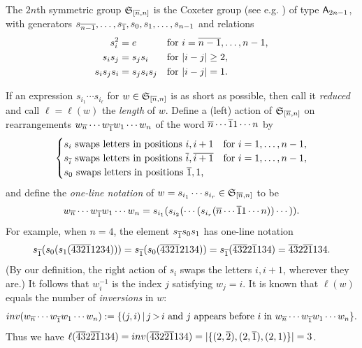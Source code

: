 \documentclass[11pt]{article}
\theoremstyle{definition}
\numberwithin{equation}{section}
\begin{document}
\label{ss:bnassubgp}
The $2n$th symmetric group
$\mathfrak{S}_{\smash{[\overline{n}, n]}}$
is the Coxeter group
(see e.g. \cite{BBCoxeter}) of type $\mathsf{A}_{2n-1}$,
with generators
  $s_{\overline{n-1}}, \dotsc, s_{\overline{1}}, s_0, s_1, \dotsc, s_{n-1}$
and relations
\begin{equation*}
  \begin{alignedat}2
    s_i^2 &= e &\quad &\text{for $i = \ol{n-1}, \dotsc, n-1$,}\\
    s_is_j &= s_js_i &\quad &\text{for $|i-j| \geq 2$,}\\
    s_is_js_i &= s_js_is_j &\quad &\text{for $|i-j| = 1$.}
  \end{alignedat}
\end{equation*}

If an expression $s_{i_1} \cdots s_{i_\ell}$ for $w \in \mathfrak{S}_{\smash{[\overline{n}, n]}}$
is as short as possible,
then call it {\em reduced} and call $\ell = \ell(w)$ the {\em length} of $w$.
Define a (left) action of $\mathfrak{S}_{\smash{[\overline{n}, n]}}$ on rearrangements
$w_{\overline{n}} \cdots w_{\overline{1}} w_1 \cdots w_n$ of the word
$\overline{n} \cdots \overline{1} 1 \cdots n$ by
\begin{equation}\label{eq:laction}
  \begin{cases}
    s_i \text{ swaps letters in positions $i, i+1$}
      &\text{for $i = 1, \dotsc, n-1$},\\
    s_{\ol i} \text{ swaps letters in positions $\ol i, \ol{i+1}$}
      &\text{for $i = 1, \dotsc, n-1$},\\
    s_0 \text{ swaps letters in positions $\ol 1, 1$,}
  \end{cases}
\end{equation}
and
define the {\em one-line notation} of $w = s_{i_1} \cdots s_{i_r} \in \mathfrak{S}_{\smash{[\overline{n}, n]}}$ to be
\begin{equation}\label{eq:s2nrearrange}
  w_{\ol n} \cdots w_{\ol 1} w_1 \cdots w_n 
= s_{i_1}(s_{i_2}( \cdots (s_{i_r}( \ol n \cdots \ol 1 1 \cdots n)) \cdots )).
\end{equation}
For example, when $n=4$, the element $s_{\overline{1}}s_0s_1$
has one-line notation
\begin{equation*}
    s_{\overline{1}}(s_0( s_1(\overline{4} \overline{3} \overline{2} \overline{1} 1234)))
    = s_{\overline{1}}(s_0(\overline{4} \overline{3} \overline{2} \overline{1} 2 1 3 4))
    = s_{\overline{1}}(\overline{4} \overline{3} \overline{2} 2 \overline{1} 1 3 4)
    = \overline{4}\overline{3} 2 \overline{2} \overline{1} 1 3 4.
  \end{equation*}
(By our definition, the right action of $s_i$ swaps the letters $i, i+1$,
wherever they are.)
It follows that $w_i^{-1}$ is the index $j$ satisfying $w_j = i$.
It is known that $\ell(w)$ equals the number of {\em inversions} in $w$:
\begin{equation*}
  \inv(w_{\ol n} \cdots w_{\ol1} w_1 \cdots w_n) \defeq
  \{ (j,i) \,|\, j \mkern -2mu > \mkern -2mu i \text{ and $j$ appears before $i$ in $w_{\ol n} \cdots w_{\ol1} w_1 \cdots w_n$} \}.
  \end{equation*}
Thus we have
  $\ell(\ol4\ol32\ol2\ol1134) =
  \inv(\ol4\ol32\ol2\ol1134) =
  |\{(2,\ol2), (2,\ol1), (2,1)\}| = 3$.
\end{document}

